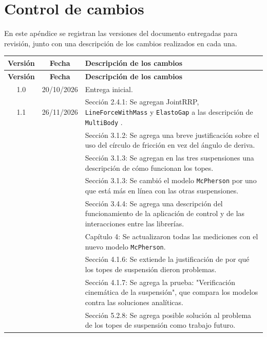 \chapter{Control de cambios}
\label{app:changelog}

En este apéndice se registran las versiones del documento entregadas para revisión,
junto con una descripción de los cambios realizados en cada una.

\begin{longtable}{|c|c|p{}|}
	\hline
	\textbf{Versión} & \textbf{Fecha} & \textbf{Descripción de los cambios} \\ \hline
	\endfirsthead
	\hline
	\textbf{Versión} & \textbf{Fecha} & \textbf{Descripción de los cambios} \\ \hline
	\endhead
	\hline
	\endfoot
	
	1.0 & 20/10/2026 & Entrega inicial. \\ \hline
	1.1 & 26/11/2026 & Sección 2.4.1: Se agregan JointRRP, \verb|LineForceWithMass| y \verb|ElastoGap| a las descripción de \verb|MultiBody| . \\ 
	& & Sección 3.1.2: Se agrega una breve justificación sobre el uso del círculo de fricción en vez del ángulo de deriva. \\ 
	& & Sección 3.1.3: Se agregan en las tres suspensiones una descripción de cómo funcionan los topes. \\ 
	& & Sección 3.1.3: Se cambió el modelo \verb|McPherson| por uno que está más en línea con las otras suspensiones. \\
	& & Sección 3.4.4: Se agrega una descripción del funcionamiento de la aplicación de control y de las interacciones entre las librerías. \\
	& & Capítulo 4: Se actualizaron todas las mediciones con el nuevo modelo \verb|McPherson|. \\
	& &  Sección 4.1.6: Se extiende la justificación de por qué los topes de suspensión dieron problemas. \\
	& &  Sección 4.1.7: Se agrega la prueba: "Verificación cinemática de la suspensión", que compara los modelos contra las soluciones analíticas. \\
	& & Sección 5.2.8: Se agrega posible solución al problema de los topes de suspensión como trabajo futuro. \\ \hline
\end{longtable}